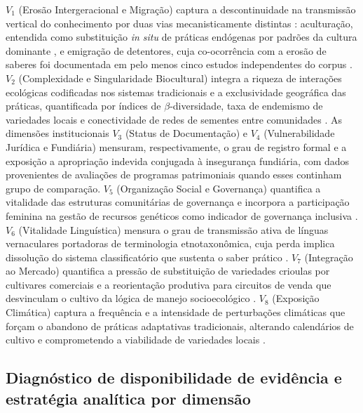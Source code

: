 $V_1$ (Erosão Intergeracional e Migração) captura a descontinuidade na transmissão vertical do conhecimento por duas vias mecanisticamente distintas \cite{ReyesGarcia2013}: aculturação, entendida como substituição \textit{in situ} de práticas endógenas por padrões da cultura dominante \cite{GomezBaggethun2013}, e emigração de detentores, cuja co-ocorrência com a erosão de saberes foi documentada em pelo menos cinco estudos independentes do corpus \cite{Tran2025,Moller2023,Bastos2022,VazquezDelfin2022,Aniah2019}. $V_2$ (Complexidade e Singularidade Biocultural) integra a riqueza de interações ecológicas codificadas nos sistemas tradicionais \cite{Jarvis2008,Brush2004} e a exclusividade geográfica das práticas, quantificada por índices de $\beta$-diversidade, taxa de endemismo de variedades locais e conectividade de redes de sementes entre comunidades \cite{Sibanda2025}. As dimensões institucionais $V_3$ (Status de Documentação) e $V_4$ (Vulnerabilidade Jurídica e Fundiária) mensuram, respectivamente, o grau de registro formal e a exposição a apropriação indevida conjugada à insegurança fundiária, com dados provenientes de avaliações de programas patrimoniais quando esses continham grupo de comparação. $V_5$ (Organização Social e Governança) quantifica a vitalidade das estruturas comunitárias de governança \cite{Ostrom1990,Pretty2003} e incorpora a participação feminina na gestão de recursos genéticos como indicador de governança inclusiva \cite{Sibanda2025,RomeroSilva2026,MugiNgenga2016}. $V_6$ (Vitalidade Linguística) mensura o grau de transmissão ativa de línguas vernaculares portadoras de terminologia etnotaxonômica, cuja perda implica dissolução do sistema classificatório que sustenta o saber prático \cite{CamaraLeret2021,LewisSiomns2010}. $V_7$ (Integração ao Mercado) quantifica a pressão de substituição de variedades crioulas por cultivares comerciais e a reorientação produtiva para circuitos de venda que desvinculam o cultivo da lógica de manejo socioecológico \cite{Godoy2005,ReyesGarcia2013}. $V_8$ (Exposição Climática) captura a frequência e a intensidade de perturbações climáticas que forçam o abandono de práticas adaptativas tradicionais, alterando calendários de cultivo e comprometendo a viabilidade de variedades locais \cite{Savo2016,Aniah2019}.

\subsection{Diagnóstico de disponibilidade de evidência e estratégia analítica por dimensão}
\label{sec:diagnosis_cap2}

